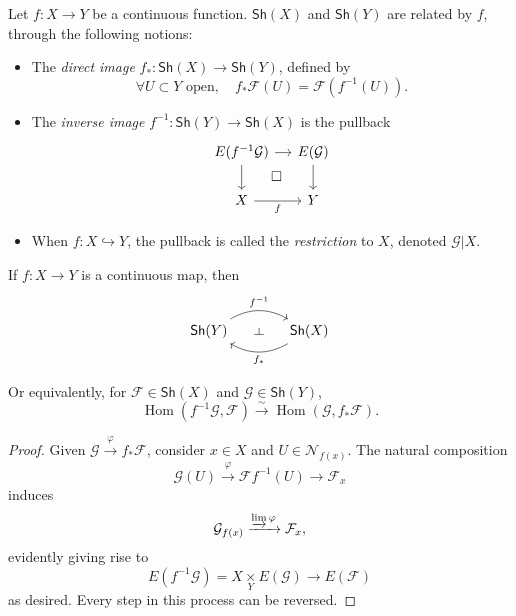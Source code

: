 
\begin{definition}
    Let $f:X\to Y$ be a continuous function. $\mathsf{Sh}(X)$ and $\mathsf{Sh}(Y)$ are related by $f$, through the following notions:
    \begin{itemize}
        \item The \emph{direct image} $f_*:\mathsf{Sh}(X)\to\mathsf{Sh}(Y)$, defined by
        $$\forall U\subset Y\text{ open},\quad f_*\mathcal{F}(U)=\mathcal{F}(f^{-1}(U)).$$
        
        \item The \emph{inverse image} $f^{-1}:\mathsf{Sh}(Y)\to\mathsf{Sh}(X)$ is the pullback
        \[ \begin{tikzcd}[column sep=small]
            E(f^{-1}\mathcal{G}) \arrow[r] \arrow[d] \arrow[rd, "\Box" description, phantom, pos=0.4] & E(\mathcal{G}) \arrow[d] \\
            X \arrow[r, "f"'] & Y 
        \end{tikzcd} \]

        \item When $f:X\hookrightarrow Y$, the pullback is called the \emph{restriction} to $X$, denoted $\mathcal{G}|X$.
    \end{itemize}
\end{definition}

\begin{theorem}\label{thm.shf.pulbck}
    If $f:X\to Y$ is a continuous map, then
    \[ \begin{tikzcd}[column sep=large]
        \mathsf{Sh}(Y) \arrow[r, bend left, "f^{-1}"{name=U}] & \mathsf{Sh}(X) \arrow[l, bend left, "f_*"{name=D}] \arrow[phantom, from=U, to=D, sloped, "\dashv"]
    \end{tikzcd} \]
    
    Or equivalently, for $\mathcal{F}\in\mathsf{Sh}(X)$ and $\mathcal{G}\in\mathsf{Sh}(Y)$,
    $$\operatorname{Hom}(f^{-1}\mathcal{G},\mathcal{F})\xrightarrow{\sim}\operatorname{Hom}(\mathcal{G},f_*\mathcal{F}).$$
\end{theorem}

\begin{proof}
    Given $\mathcal{G}\xrightarrow{\varphi} f_*\mathcal{F}$, consider $x\in X$ and $U\in\mathcal{N}_{f(x)}$. The natural composition
    $$\mathcal{G}(U)\xrightarrow{\varphi}\mathcal{F}f^{-1}(U)\to\mathcal{F}_x$$
    induces
    $$\mathcal{G}_{f(x)}\xrightarrow{\varinjlim\varphi}\mathcal{F}_x,$$
    evidently giving rise to
    $$E(f^{-1}\mathcal{G})=X\underset{Y}{\times}E(\mathcal{G})\longrightarrow E(\mathcal{F})$$
    as desired. Every step in this process can be reversed.
\end{proof}

